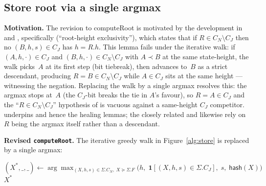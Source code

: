 \documentclass{article}
\newcommand{\hash}{\mathsf{hash}}
\newcommand{\computeRoot}{\textsf{computeRoot}\xspace}
\renewcommand{\paragraph}[1]{\vspace{7pt}\noindent\textbf{#1}}
\theoremstyle{plain}
\theoremstyle{definition}
\theoremstyle{remark}
\begin{document}
\subsection{Store root via a single argmax}\label{rev:sec:store-root}

\paragraph{Motivation.}
The revision to \computeRoot is motivated by the development in  and , specifically  (``root-height exclusivity''), which states that if $R \in C_N \setminus C_J$ then no $(B, h, s) \in C_J$ has $h = R.h$.
This lemma fails under the iterative walk: if $(A, h, \cdot) \in C_J$ and $(B, h, \cdot) \in C_N \setminus C_J$ with $A \prec B$ at the same state-height, the walk picks~$A$ at its first step (bit tiebreak), then advances to~$B$ as a strict descendant, producing $R = B \in C_N \setminus C_J$ while $A \in C_J$ sits at the same height --- witnessing the negation.
Replacing the walk by a single argmax resolves this: the argmax stops at~$A$ (the $C_J$-bit breaks the tie in $A$'s favour), so $R = A \in C_J$ and the ``$R \in C_N \setminus C_J$'' hypothesis of  is vacuous against a same-height $C_J$ competitor.
 underpins  and hence the healing lemmas; the closely related  and  likewise rely on $R$ being the argmax itself rather than a descendant.

\paragraph{Revised \texttt{computeRoot}.}
The iterative greedy walk in Figure~\ref{alg:store} is replaced by a single argmax:
\begin{center}
\begin{minipage}{0.9\textwidth}
\begin{algorithmic}[1]
\Function{\computeRoot}{$\Sigma$} 
  \State $(X^*, \_, \_) \gets \arg\max_{(X,h,s) \in \Sigma.C_N,\; X \succeq \Sigma.F} \bigl(h,\; \mathbf{1}[(X,h,s) \in \Sigma.C_J],\; s,\; \hash(X)\bigr)$
  \State \Return $X^*$
\EndFunction
\end{algorithmic}
\end{minipage}
\end{center}
\end{document}
